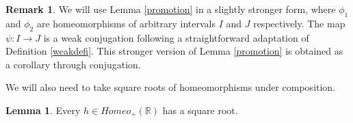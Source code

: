 \documentclass[12pt]{article}
\newcommand{\R}{\mathbb{R}}
\newcommand{\Z}{\mathbb Z}
\newcommand{\Fix}{\mathrm{Fix}}
\theoremstyle{definition}
\newtheorem{lem}[thm]{Lemma}
\newtheorem{rem}[thm]{Remark}
\begin{document}
%
%
%

\begin{rem}\label{paintervalo} We will use Lemma \ref{promotion} in a slightly stronger form, where $\phi_1$ and $\phi_2$ are homeomorphisms of arbitrary intervals $I$ and $J$ respectively. The map $\psi:I\to J$ is a weak conjugation following a straightforward adaptation of Definition \ref{weakdefi}. This stronger version of Lemma \ref{promotion} is obtained as a corollary through conjugation. 
\end{rem}

We will also need to take square roots of homeomorphisms under composition.

\begin{lem}\label{raiz} Every $h\in Homeo_{+}(\R)$ has a square root.
\end{lem}
\end{document}
